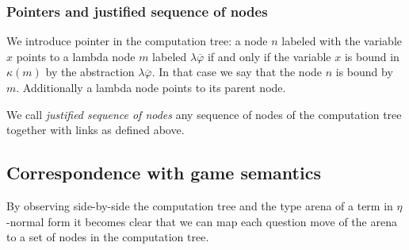 \subsubsection{Pointers and justified sequence of nodes}
We introduce pointer in the computation tree: a node $n$ labeled
with the variable $x$ points to a lambda node $m$ labeled $\lambda
\overline{\varphi}$ if and only if the variable $x$ is bound in
$\kappa(m)$ by the abstraction $\lambda \overline{\varphi}$. In that
case we say that the node $n$ is bound by $m$. Additionally a lambda node points to its parent node.

We call \emph{justified sequence of nodes} any sequence of nodes of the computation tree together
with links as defined above.

\subsection{Correspondence with game semantics}

By observing side-by-side the computation tree and the type arena of a term in $\eta$-normal form it becomes clear that
we can map each question move of the arena to a set of nodes in the computation tree.


